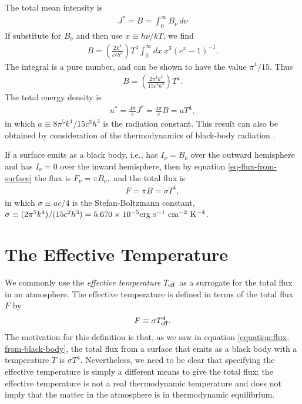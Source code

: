 \newslide

The total mean intensity is
\begin{align}
J^* = B = \int_0^\infty
B_\nu\,d\nu
\end{align}
If substitute for $B_\nu$ and then use $x \equiv h\nu / kT$,
we find
\begin{align}
B = \left(\frac{2 k^4}{c^2 h^3}\right) T^4 \int_0^\infty\!\!\!dx\: x^3(e^x -
1)^{-1}.
\end{align}
The integral is a pure number, and can be shown to have the
value $\pi^4/15$. Thus
\begin{align}
B = \left(\frac{2 \pi^4 k^4}{15 c^2 h^3}\right)T^4.
\end{align}
The total energy density is
\begin{align}
u^* = \frac{4\pi}{c} J^* = \frac{4\pi}{c} B = a T^4,
\end{align}
in which $a \equiv 8 \pi^5 k^4 / 15 c^3 h^3$ is the radiation constant.
This result can also be obtained by consideration of the thermodynamics
of black-body radiation \citep[pp.\ 17--18]{Rybicki-1979}.

\newslide

If a surface emits as a black body, i.e., has $I_\nu = B_\nu$ over
the outward hemisphere and has $I_\nu = 0$ over the inward hemisphere,
then by equation \ref{eq-flux-from-surface} the flux is $F_\nu
= \pi B_\nu,$ and the total flux is 
\begin{align}
F = \pi B
= \sigma T^4,
\label{equation:flux-from-black-body}
\end{align}
in which $\sigma \equiv ac / 4$ is the Stefan-Boltzmann constant,
$\sigma \equiv (2\pi^5k^4)/(15c^2h^3) = 5.670 \times
10^{-5}\space\mathrm{erg~s^{-1}~cm^{-2}~K^{-4}}$.

\newslide

\section{The Effective Temperature}

We commonly use the \emph{effective temperature} $T_\mathrm{eff}$ as a surrogate
for the total flux in an atmosphere. The effective temperature is
defined in terms of the total flux $F$ by
\begin{align}
F \equiv \sigma T_\mathrm{eff}^4.
\label{eq-effective-temperature}
\end{align}
The motivation for this definition is that, as we saw in equation
\ref{equation:flux-from-black-body}, the total flux from a surface that
emits as a black body with a temperature $T$ is $\sigma T^4$.
Nevertheless, we need to be clear that specifying the effective
temperature is simply a different means to give the total flux; the
effective temperature is not a real thermodynamic temperature and does
not imply that the matter in the atmosphere is in thermodynamic
equilibrium.

